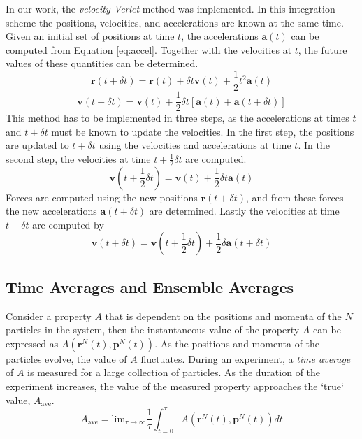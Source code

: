 In our work, the \textit{velocity Verlet} method was implemented. In
this integration scheme the positions, velocities, and accelerations
are known at the same time. Given an initial set of positions at time
$t$, the accelerations $\mathbf{a}(t)$ can be computed from Equation
\eqref{eq:accel}. Together with the velocities at $t$, the future
values of these quantities can be determined.
\begin{equation}\label{eq:vv-r}
\mathbf{r}(t+\delta t) = \mathbf{r}(t) + \delta t \mathbf{v}(t) +
\frac{1}{2}t^2\mathbf{a}(t)
\end{equation}
\begin{equation}\label{eq:vv-v}
\mathbf{v}(t+ \delta t) = \mathbf{v}(t) + \frac{1}{2}\delta
t[\mathbf{a}(t) + \mathbf{a}(t + \delta t)]
\end{equation}
This method has to be implemented in three steps, as the accelerations
at times $t$ and $t + \delta t$ must be known to update the
velocities. In the first step, the positions are updated to
$t + \delta t$ using the velocities and accelerations at time $t$. In
the second step, the velocities at time $t + \frac{1}{2} \delta t$ are
computed.
\begin{equation}\label{eq:vv-v2}
\mathbf{v}(t+\frac{1}{2}\delta t) = \mathbf{v}(t) + \frac{1}{2}\delta t
\mathbf{a}(t)
\end{equation}
Forces are computed using the new positions $\mathbf{r}(t + \delta
t)$, and from these forces the new accelerations $\mathbf{a}(t +
\delta t)$ are determined. Lastly the velocities at time $t + \delta
t$ are computed by
\begin{equation}\label{eq:vv-v3}
\mathbf{v}(t+\delta t) = \mathbf{v}(t+\frac{1}{2}\delta t) +
\frac{1}{2}\delta \mathbf{a}(t + \delta t)
\end{equation}


\subsection{Time Averages and Ensemble Averages}
Consider a property $A$ that is dependent on the positions and momenta
of the $N$ particles in the system, then the instantaneous value of
the property $A$ can be expressed as
$A(\mathbf{r}^N(t),\mathbf{p}^N(t))$. As the positions and momenta of
the particles evolve, the value of $A$ fluctuates. During an
experiment, a \textit{time average} of $A$ is measured for a large
collection of particles. As the duration of the experiment increases,
the value of the measured property approaches the `true` value,
$A_{\mathrm{ave}}$.
\begin{equation}\label{eq:A-ave}
A_{\mathrm{ave}} = \mathrm{lim}_{\tau \to \infty} \frac{1}{\tau} \int_{t=0}^{\tau}
A(\mathbf{r}^N(t),\mathbf{p}^N(t))dt
\end{equation}

